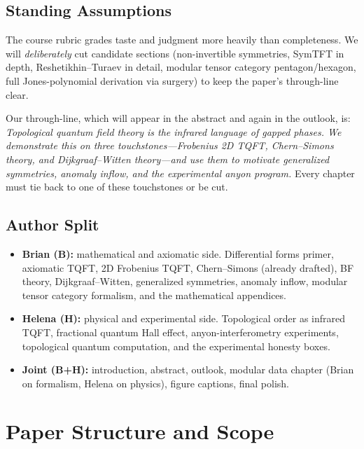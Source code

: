 \documentclass[11pt]{article}
\begin{document}
\subsection{Standing Assumptions}

\begin{insight}
The course rubric grades taste and judgment more heavily than completeness. We will
\emph{deliberately} cut candidate sections (non-invertible symmetries, SymTFT in depth,
Reshetikhin--Turaev in detail, modular tensor category pentagon/hexagon, full Jones-polynomial
derivation via surgery) to keep the paper's through-line clear.
\end{insight}

Our through-line, which will appear in the abstract and again in the outlook, is:
\emph{Topological quantum field theory is the infrared language of gapped phases. We
demonstrate this on three touchstones---Frobenius 2D TQFT, Chern--Simons theory, and
Dijkgraaf--Witten theory---and use them to motivate generalized symmetries, anomaly inflow,
and the experimental anyon program.} Every chapter must tie back to one of these
touchstones or be cut.

\subsection{Author Split}\label{sec:split}

\begin{itemize}
\item \textbf{Brian (B):} mathematical and axiomatic side. Differential forms primer,
axiomatic TQFT, 2D Frobenius TQFT, Chern--Simons (already drafted), BF theory,
Dijkgraaf--Witten, generalized symmetries, anomaly inflow, modular tensor category
formalism, and the mathematical appendices.
\item \textbf{Helena (H):} physical and experimental side. Topological order as
infrared TQFT, fractional quantum Hall effect, anyon-interferometry experiments,
topological quantum computation, and the experimental honesty boxes.
\item \textbf{Joint (B+H):} introduction, abstract, outlook, modular data chapter
(Brian on formalism, Helena on physics), figure captions, final polish.
\end{itemize}

\section{Paper Structure and Scope}\label{sec:structure}
\end{document}
